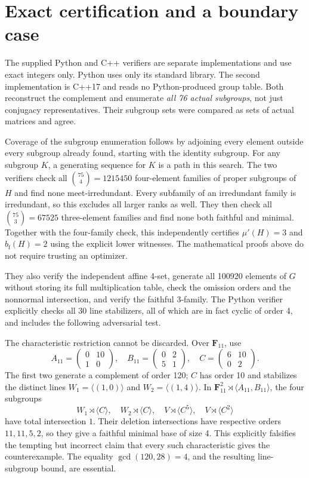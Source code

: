 \documentclass[11pt]{article}
\theoremstyle{remark}\newtheorem{remark}[theorem]{Remark}
\newcommand{\F}{\mathbf F}
\newcommand{\mup}{\mu'}
\newcommand{\bfth}{b_{\mathrm f}}
\begin{document}
\section{Exact certification and a boundary case}
The supplied Python and C++ verifiers are separate implementations and use
exact integers only. Python uses
only its standard library. The second implementation is C++17 and reads no
Python-produced group table. Both reconstruct the complement and enumerate
\emph{all 76 actual subgroups}, not just conjugacy representatives. Their
subgroup sets were compared as sets of actual matrices and agree.

Coverage of the subgroup enumeration follows by adjoining every element
outside every subgroup already found, starting with the identity subgroup.
For any subgroup $K$, a generating sequence for $K$ is a path in this search.
The two verifiers check all $\binom{75}{4}=1215450$ four-element families of
proper subgroups of $H$ and find none meet-irredundant. Every subfamily of an
irredundant family is irredundant, so this excludes all larger ranks as well.
They then check all $\binom{75}{3}=67525$ three-element families and find none
both faithful and minimal. Together with the four-family check, this
independently certifies $\mup(H)=3$ and $\bfth(H)=2$ using the explicit lower
witnesses. The mathematical proofs above do not require trusting an optimizer.

They also verify the independent affine 4-set, generate all 100920 elements
of $G$ without storing its full multiplication table, check the omission
orders and the nonnormal intersection, and verify the faithful 3-family.
The Python verifier explicitly checks all 30 line stabilizers, all of which
are in fact cyclic of order 4, and includes the following adversarial test.

The characteristic restriction cannot be discarded. Over $\F_{11}$, use
\[
 A_{11}=\begin{pmatrix}0&10\\1&0\end{pmatrix},\quad
 B_{11}=\begin{pmatrix}0&2\\5&1\end{pmatrix},\quad
 C=\begin{pmatrix}6&10\\0&2\end{pmatrix}.
\]
The first two generate a complement of order 120; $C$ has order 10 and
stabilizes the distinct lines $W_1=\langle(1,0)\rangle$ and
$W_2=\langle(1,4)\rangle$. In $\F_{11}^2\rtimes\langle A_{11},B_{11}\rangle$,
the four subgroups
\[
 W_1\rtimes\langle C\rangle,\quad
 W_2\rtimes\langle C\rangle,\quad
 V\rtimes\langle C^5\rangle,\quad
 V\rtimes\langle C^2\rangle
\]
have total intersection $1$. Their deletion intersections have respective
orders $11,11,5,2$, so they give a faithful minimal base of size 4. This
explicitly falsifies the tempting but incorrect claim that every such
characteristic gives the counterexample. The equality
$\gcd(120,28)=4$, and the resulting line-subgroup bound, are essential.
\end{document}
